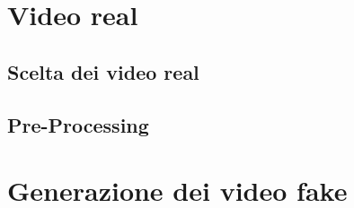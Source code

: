 \section{Video real}
\subsection{Scelta dei video real}
\subsection{Pre-Processing}
\section{Generazione dei video fake}

\clearpage